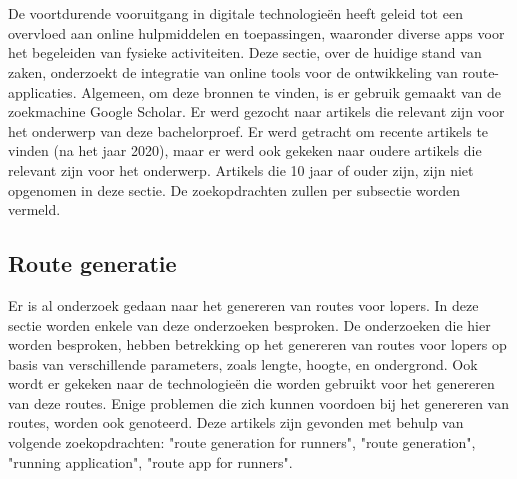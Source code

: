 \chapter{}%
\label{ch:stand-van-zaken}



De voortdurende vooruitgang in digitale technologieën heeft geleid tot een overvloed aan online hulpmiddelen en toepassingen,
waaronder diverse apps voor het begeleiden van fysieke activiteiten.
Deze sectie, over de huidige stand van zaken, onderzoekt de integratie van online tools voor de ontwikkeling van route-applicaties.
Algemeen, om deze bronnen te vinden, is er gebruik gemaakt van de zoekmachine Google Scholar. Er werd gezocht naar artikels die relevant zijn voor het onderwerp van deze bachelorproef.
Er werd getracht om recente artikels te vinden (na het jaar 2020), maar er werd ook gekeken naar oudere artikels die relevant zijn voor het onderwerp. Artikels die 10 jaar of ouder zijn, zijn niet opgenomen in deze sectie.
De zoekopdrachten zullen per subsectie worden vermeld.

    \section{Route generatie}

    Er is al onderzoek gedaan naar het genereren van routes voor lopers. In deze sectie worden enkele van deze onderzoeken besproken.
    De onderzoeken die hier worden besproken, hebben betrekking op het genereren van routes voor lopers op basis van verschillende parameters, zoals lengte, hoogte, en ondergrond. 
    Ook wordt er gekeken naar de technologieën die worden gebruikt voor het genereren van deze routes. Enige problemen die zich kunnen voordoen bij het genereren van routes, worden ook genoteerd.
    Deze artikels zijn gevonden met behulp van volgende zoekopdrachten: "route generation for runners", "route generation", "running application", "route app for runners".

